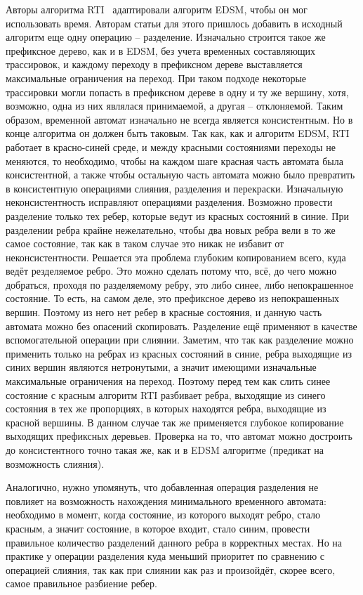 \documentclass[times,specification,annotation]{itmo-student-thesis}
\begin{document}
Авторы алгоритма RTI~\cite{rti} адаптировали алгоритм EDSM, чтобы он мог использовать время. Авторам статьи для этого пришлось добавить в исходный алгоритм еще одну операцию -- разделение.
Изначально строится такое же префиксное дерево, как и в EDSM, без учета временных составляющих трассировок, и каждому переходу в префиксном дереве выставляется максимальные ограничения на переход.
При таком подходе некоторые трассировки могли попасть в префиксном дереве в одну и ту же вершину, хотя, возможно, одна из них являлася принимаемой, а другая -- отклоняемой. Таким образом, временной
автомат изначально не всегда является консистентным. Но в конце алгоритма он должен быть таковым. Так как, как и алгоритм EDSM, RTI работает в красно-синей среде, и между красными состояниями
переходы не меняются, то необходимо, чтобы на каждом шаге красная часть автомата была консистентной, а также чтобы остальную часть автомата можно было превратить в консистентную
операциями слияния, разделения и перекраски. Изначальную неконсистентность исправляют операциями разделения. Возможно провести разделение только тех ребер, которые ведут из красных состояний в синие. 
При разделении ребра крайне нежелательно, чтобы два новых ребра вели в то же самое состояние, так как в таком случае это никак не избавит от неконсистентности.
Решается эта проблема глубоким копированием всего, куда ведёт резделяемое ребро. Это можно сделать потому что, всё, до чего можно добраться, проходя по разделяемому ребру, это либо синее, либо
непокрашенное состояние. То есть, на самом деле, это префиксное дерево из непокрашенных вершин. Поэтому из него нет ребер в красные состояния, и данную часть автомата можно без опасений скопировать.
Разделение ещё применяют в качестве вспомогательной операции при слиянии. Заметим, что так как разделение можно применить только на ребрах из красных состояний в синие, ребра выходящие из синих
вершин являются нетронутыми, а значит имеющими изначальные максимальные ограничения на переход. Поэтому перед тем как слить синее состояние с красным алгоритм RTI разбивает ребра, 
выходящие из синего состояния в тех же пропорциях, в которых находятся ребра, выходящие из красной вершины. В данном случае так же применяется глубокое копирование выходящих префиксных деревьев.
Проверка на то, что автомат можно достроить до консистентного точно такая же, как и в EDSM алгоритме (предикат на возможность слияния).

Аналогично, нужно упомянуть, что добавленная операция разделения не повлияет на возможность нахождения минимального временного автомата: необходимо в момент, когда состояние, из которого
выходят ребро, стало красным, а значит состояние, в которое входит, стало синим, провести правильное количество разделений данного ребра в корректных местах. Но на практике у операции
разделения куда меньший приоритет по сравнению с операцией слияния, так как при слиянии как раз и произойдёт, скорее всего, самое правильное разбиение ребер. 
\end{document}
